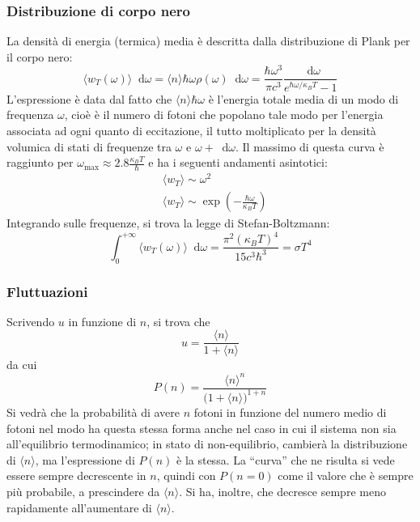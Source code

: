 \documentclass[11pt, a4paper]{scrartcl}
\theoremstyle{style}
\newcommand{\dd}{\mathop{}\!\mathrm{d}}
\numberwithin{equation}{subsection}
\begin{document}
\subsubsection{Distribuzione di corpo nero}
La densit\`a di energia (termica) media \`e descritta dalla distribuzione di Plank per il corpo nero:
\begin{equation}
	\langle w_T(\omega ) \rangle \dd \omega = \langle n \rangle \hbar \omega \rho (\omega ) \dd \omega = \frac{\hbar \omega ^3}{\pi c^3} \frac{\dd \omega }{e^{\hbar \omega  / \kappa _B T }-1}
\end{equation}
L'espressione \`e data dal fatto che $\langle n \rangle\hbar \omega $ \`e l'energia totale media di un modo di frequenza $\omega$, cio\`e \`e il numero di fotoni che popolano tale modo per l'energia associata ad ogni quanto di eccitazione, il tutto moltiplicato per la densit\`a volumica di stati di frequenze tra $\omega$ e $\omega + \dd \omega $.
Il massimo di questa curva \`e raggiunto per $\omega _\text{max} \approx 2.8 \frac{\kappa _B T }{\hbar }$ e ha i seguenti andamenti asintotici:
\begin{align}
	&\langle w_T \rangle \sim \omega ^2 \tag{$\hbar \omega  \ll \kappa _B T $}\\
	& \langle w_T \rangle \sim \exp \left(- \frac{\hbar \omega }{\kappa _B T}\right)  \tag{$\hbar \omega \gg \kappa _B T$}
\end{align}
Integrando sulle frequenze, si trova la legge di Stefan-Boltzmann:
\begin{equation}
	\int _0^{+\infty} \langle w_T(\omega ) \rangle \dd \omega = \frac{\pi^2 (\kappa _B T)^4}{15 c^3 \hbar ^3} = \sigma T^4
\end{equation}

\subsubsection{Fluttuazioni}
Scrivendo $u$ in funzione di $n$, si trova che 
\[
u =  \frac{\langle n \rangle}{1+\langle n \rangle}
\] 
da cui 
\begin{equation}
	P(n) = \frac{\langle n \rangle ^n}{\big( 1 + \langle n \rangle\big) ^{1 + n}}
\end{equation}
Si vedr\`a che la probabilit\`a di avere $n$ fotoni in funzione del numero medio di fotoni nel modo ha questa stessa forma anche nel caso in cui il sistema non sia all'equilibrio termodinamico; in stato di non-equilibrio, cambier\`a la distribuzione di $\langle n \rangle$, ma l'espressione di $P(n)$ \`e la stessa.
La ``curva'' che ne risulta si vede essere sempre decrescente in $n$, quindi con $P(n=0)$ come il valore che \`e sempre pi\`u probabile, a prescindere da $\langle n \rangle$.
Si ha, inoltre, che decresce sempre meno rapidamente all'aumentare di $\langle n \rangle$.
\end{document}
